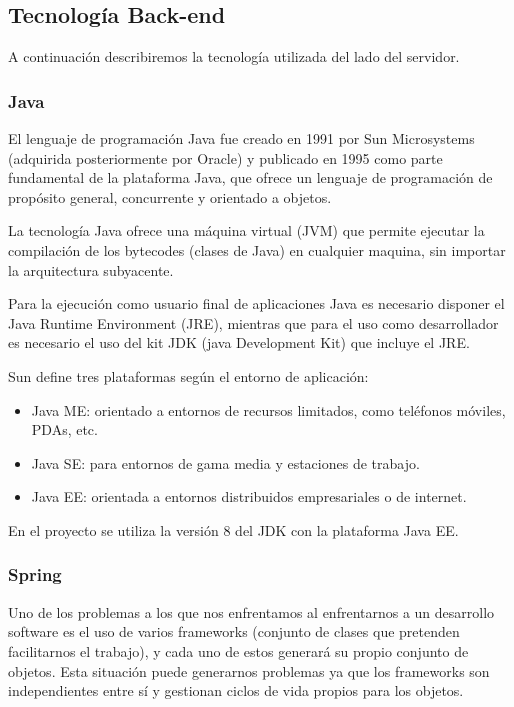 \subsection{Tecnología Back-end}
A continuación describiremos la tecnología utilizada del lado del servidor.

\subsubsection{Java}

El lenguaje de programación Java fue creado en 1991 por Sun Microsystems (adquirida posteriormente por Oracle) y publicado en 1995 como parte fundamental de la plataforma Java, que ofrece un lenguaje de programación de propósito general, concurrente y orientado a objetos.

La tecnología Java ofrece una máquina virtual (JVM) que permite ejecutar la compilación de los bytecodes (clases de Java) en cualquier maquina, sin importar la arquitectura subyacente.

Para la ejecución como usuario final de aplicaciones Java es necesario disponer el Java Runtime Environment (JRE), mientras que para el uso como desarrollador es necesario el uso del kit JDK (java Development Kit) que incluye el JRE.

Sun define tres plataformas según el entorno de aplicación:
\begin{itemize}
	\item Java ME: orientado a entornos de recursos limitados, como teléfonos móviles, PDAs, etc.
	\item Java SE: para entornos de gama media y estaciones de trabajo.
	\item Java EE: orientada a entornos distribuidos empresariales o de internet.
\end{itemize}

En el proyecto se utiliza la versión 8 del JDK con la plataforma Java EE.

\subsubsection{Spring}

Uno de los problemas a los que nos enfrentamos al enfrentarnos a un desarrollo software es el uso de varios frameworks (conjunto de clases que pretenden facilitarnos el trabajo), y cada uno de estos generará su propio conjunto de objetos. Esta situación puede generarnos problemas ya que los frameworks son independientes entre sí y gestionan ciclos de vida propios para los objetos.

